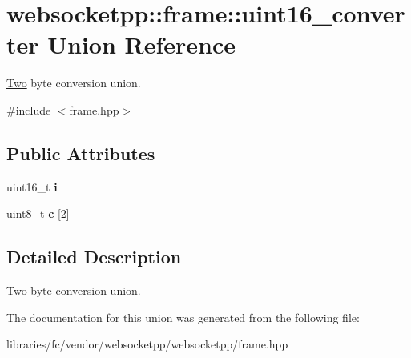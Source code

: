 \hypertarget{unionwebsocketpp_1_1frame_1_1uint16__converter}{}\section{websocketpp\+:\+:frame\+:\+:uint16\+\_\+converter Union Reference}
\label{unionwebsocketpp_1_1frame_1_1uint16__converter}


\mbox{\hyperlink{struct_two}{Two}} byte conversion union.  




{\ttfamily \#include $<$frame.\+hpp$>$}

\subsection*{Public Attributes}
\begin{DoxyCompactItemize}
\item 
\mbox{\label{unionwebsocketpp_1_1frame_1_1uint16__converter_af60efc5747260bafeb6cd2b8ab267e2d}} 
uint16\+\_\+t {\bfseries i}
\item 
\mbox{\label{unionwebsocketpp_1_1frame_1_1uint16__converter_acac6733730c538163e39f4fed359168a}} 
uint8\+\_\+t {\bfseries c} \mbox{[}2\mbox{]}
\end{DoxyCompactItemize}


\subsection{Detailed Description}
\mbox{\hyperlink{struct_two}{Two}} byte conversion union. 

The documentation for this union was generated from the following file\+:\begin{DoxyCompactItemize}
\item 
libraries/fc/vendor/websocketpp/websocketpp/frame.\+hpp\end{DoxyCompactItemize}
